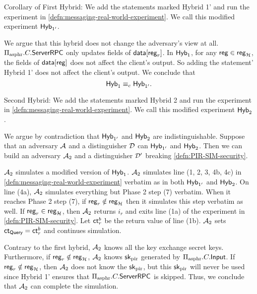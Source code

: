 Corollary of First Hybrid: We add the statements marked Hybrid 1' and run the experiment in \cref{defn:messaging-real-world-experiment}. We call this modified experiment $\mathsf{Hyb}_{1'}$.

We argue that this hybrid does not change the adversary's view at all. $\Pi_{\text{asphr}}.C.\mathsf{ServerRPC}$ only updates fields of $\mathsf{data}[\mathsf{reg}_r]$. In $\mathsf{Hyb}_1$, for any $\mathsf{reg} \in \mathsf{reg}_{\mathcal{H}}$, the fields of $\mathsf{data}[\mathsf{reg}]$ does not affect the client's output. So adding the statement' Hybrid 1' does not affect the client's output. We conclude that
$$\mathsf{Hyb}_1 \equiv_c \mathsf{Hyb}_{1'}.$$

Second Hybrid: We add the statements marked Hybrid 2 and run the experiment in \cref{defn:messaging-real-world-experiment}. We call this modified experiment $\mathsf{Hyb}_{2}$.

We argue by contradiction that $\mathsf{Hyb}_{1'}$ and $\mathsf{Hyb}_{2}$ are indistinguishable. Suppose that an adversary $\mathcal{A}$ and a distinguisher $\mathcal{D}$ can $\mathsf{Hyb}_{1'}$ and $\mathsf{Hyb}_{2}$. Then we can build an adversary $\mathcal{A}_2$ and a distinguisher $\mathcal{D}'$ breaking \cref{defn:PIR-SIM-security}. 

$\mathcal{A}_2$ simulates a modified version of $\mathsf{Hyb}_1$. $\mathcal{A}_2$ simulates line (1, 2, 3, 4b, 4c) in \cref{defn:messaging-real-world-experiment} verbatim as in both $\mathsf{Hyb}_{1'}$ and $\mathsf{Hyb}_2$. On line (4a), $\mathcal{A}_2$ simulates everything but Phase 2 step (7) verbatim. When it reaches Phase 2 step (7), if $\mathsf{reg}_r \notin \mathsf{reg}_{\mathcal{H}}$ then it simulates this step verbatim as well. If $\mathsf{reg}_r \in \mathsf{reg}_{\mathcal{H}}$, then $\mathcal{A}_2$ returns $i_r$ and exits line (1a) of the experiment in \cref{defn:PIR-SIM-security}. Let $\mathsf{ct}^b_r$ be the return value of line (1b). $\mathcal{A}_2$ sets $\mathsf{ct}_{\mathsf{Query}} = \mathsf{ct}^b_r$ and continues simulation.

Contrary to the first hybrid, $\mathcal{A}_2$ knows all the key exchange secret keys. Furthermore, if $\mathsf{reg}_r \notin \mathsf{reg}_{\mathcal{H}}$, $\mathcal{A}_2$ knows ${\mathsf{sk}}_{\text{pir}}$ generated by $\Pi_{\text{asphr}}.C.\mathsf{Input}$. If $\mathsf{reg}_r \notin \mathsf{reg}_{\mathcal{H}}$, then $\mathcal{A}_2$ does not know the ${\mathsf{sk}}_{\text{pir}}$, but this ${\mathsf{sk}}_{\text{pir}}$ will never be used since Hybrid 1' ensures that $\Pi_{\text{asphr}}.C.\mathsf{ServerRPC}$ is skipped. Thus, we conclude that $\mathcal{A}_2$ can complete the simulation.

